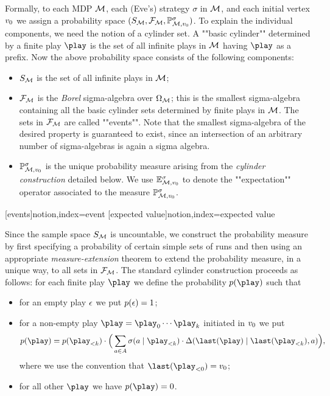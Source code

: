 Formally, to each MDP $\mathcal{M}$, each (Eve's) strategy $\sigma$ in $\mathcal{M}$, and 
each initial vertex $v_0$ we assign a probability space 
$(S_{\mathcal{M}},\mathcal{F}_{\mathcal{M}},\mathbb{P}^{\sigma}_{\mathcal{M},v_0})$. To 
explain the individual components, we need the notion of a cylinder set. A 
""basic cylinder"" determined by a finite play $\play$ is the set of 
all infinite plays in $\mathcal{M}$ having $\play$ as a prefix. Now the above 
probability space consists of the following components:
\begin{itemize}
	\item $S_{\mathcal{M}}$ is the set of all infinite plays in $\mathcal{M}$;
	\item $\mathcal{F}_{\mathcal{M}}$ is the \emph{Borel} sigma-algebra over 
	$\Omega_{\mathcal{M}}$; this is the smallest sigma-algebra containing all the 
	basic cylinder sets determined by finite plays in $\mathcal{M}$. The sets in 
	$\mathcal{F}_{\mathcal{M}}$ are called ""events"". Note that the smallest sigma-algebra of the desired property is guaranteed to exist, since an intersection of an arbitrary number of sigma-algebras is again a sigma algebra.
	\item $\mathbb{P}^{\sigma}_{\mathcal{M},v_0}$ is the unique probability measure 
	arising from the \emph{cylinder construction} detailed below. We use 
	$\mathbb{E}^{\sigma}_{\mathcal{M},v_0}$ to denote the ""expectation"" operator 
	associated to the measure $\mathbb{P}^{\sigma}_{\mathcal{M},v_0}$.
\end{itemize}
[events]{notion,index={event}}
[expected value]{notion,index={expected value}}





Since the sample space $S_{\mathcal{M}}$ is uncountable, we construct the 
probability measure by first specifying a probability of certain simple sets of 
runs and then using an appropriate \emph{measure-extension} theorem to extend 
the probability measure, in a unique way, to all sets in $\mathcal{F}_{\mathcal{M}}$.
The standard cylinder construction  
proceeds as follows: for each finite play $\play$ we define the probability 
$\cylProb(\play)$ such that

\begin{itemize}
\item for an empty play $\epsilon$ we put $p(\epsilon)=1$;
\item for a non-empty play $\play=\play_0\cdots \play_{k}$ initiated in 
$v_0$ we put 
\[\cylProb(\play) = \cylProb(\play_{< k})\cdot \Big(\sum_{a \in \actions} 
\sigma(a\mid \play_{< k})\cdot \probTranFunc(\last(\play)\mid 
\last(\play_{< k}),a) 
\Big), \]
where we use the convention that $\last(\play_{< 0})=\vinit$;
\item for all other $\play$ we have $\cylProb(\play)=0$.
\end{itemize}


